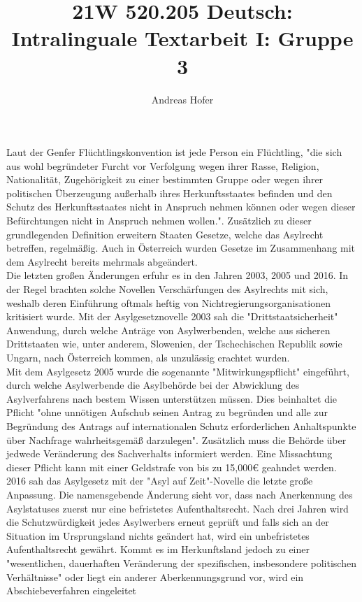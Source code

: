 \documentclass{article}
\title{\vspace{-3.5cm}21W 520.205 Deutsch: Intralinguale Textarbeit I: Gruppe 3}
\author{Andreas Hofer}
\begin{document}
	\maketitle
	Laut der Genfer Flüchtlingskonvention ist jede Person ein Flüchtling, "die sich aus wohl begründeter Furcht vor Verfolgung wegen ihrer Rasse, Religion, Nationalität, Zugehörigkeit zu einer bestimmten Gruppe oder wegen ihrer politischen Überzeugung außerhalb ihres Herkunftsstaates befinden und den Schutz des Herkunftsstaates nicht in Anspruch nehmen können oder wegen dieser Befürchtungen nicht in Anspruch nehmen wollen.". Zusätzlich zu dieser grundlegenden Definition erweitern Staaten Gesetze, welche das Asylrecht betreffen, regelmäßig. Auch in Österreich wurden Gesetze im Zusammenhang mit dem Asylrecht bereits mehrmals abgeändert. \\

	Die letzten großen Änderungen erfuhr es in den Jahren 2003, 2005 und 2016. In der Regel brachten solche Novellen Verschärfungen des Asylrechts mit sich, weshalb deren Einführung oftmals heftig von Nichtregierungsorganisationen kritisiert wurde. Mit der Asylgesetznovelle 2003 sah die "Drittstaatsicherheit" Anwendung, durch welche Anträge von Asylwerbenden, welche aus sicheren Drittstaaten wie, unter anderem, Slowenien, der Tschechischen Republik sowie Ungarn, nach Österreich kommen, als unzulässig erachtet wurden. \\

	Mit dem Asylgesetz 2005 wurde die sogenannte "Mitwirkungspflicht" eingeführt, durch welche Asylwerbende die Asylbehörde bei der Abwicklung des Asylverfahrens nach bestem Wissen unterstützen müssen. Dies beinhaltet die Pflicht "ohne unnötigen Aufschub seinen Antrag zu begründen und alle zur Begründung des Antrags auf internationalen Schutz erforderlichen Anhaltspunkte über Nachfrage wahrheitsgemäß darzulegen". Zusätzlich muss die Behörde über jedwede Veränderung des Sachverhalts informiert werden. Eine Missachtung dieser Pflicht kann mit einer Geldstrafe von bis zu 15,000€ geahndet werden. 2016 sah das Asylgesetz mit der "Asyl auf Zeit"-Novelle die letzte große Anpassung. Die namensgebende Änderung sieht vor, dass nach Anerkennung des Asylstatuses zuerst nur eine befristetes Aufenthaltsrecht. Nach drei Jahren wird die Schutzwürdigkeit jedes Asylwerbers erneut geprüft und falls sich an der Situation im Ursprungsland nichts geändert hat, wird ein unbefristetes Aufenthaltsrecht gewährt. Kommt es im Herkunftsland jedoch zu einer "wesentlichen, dauerhaften Veränderung der spezifischen, insbesondere politischen Verhältnisse" oder liegt ein anderer Aberkennungsgrund vor, wird ein Abschiebeverfahren eingeleitet
\end{document}
